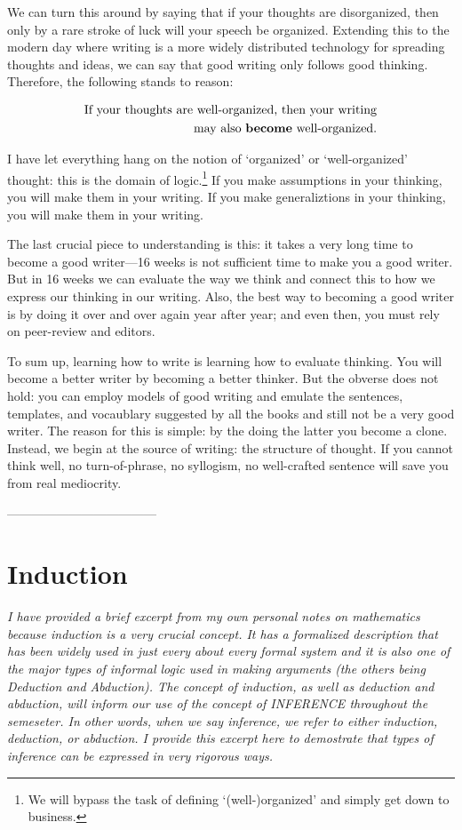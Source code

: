 \documentclass{article}
\begin{document}
We can turn this around by saying that if your thoughts are disorganized, then only by a rare stroke of luck will your speech be organized. Extending this to the modern day where writing is a more widely distributed technology for spreading thoughts and ideas, we can say that good writing only follows good thinking. Therefore, the following stands to reason:

\begin{equation}
 \begin{split}
\text{If your thoughts are well-organized, then your writing} \\
\text{may also \textbf{become} well-organized.}
 \end{split}
\end{equation}

 
I have let everything hang on the notion of `organized' or `well-organized' thought: this is the domain of logic.\footnote{We will bypass the task of defining `(well-)organized' and simply get down to business.} If you make assumptions in your thinking, you will make them in your writing. If you make generaliztions in your thinking, you will make them in your writing. 

The last crucial piece to understanding is this: it takes a very long time to become a good writer---16 weeks is not sufficient time to make you a good writer. But in 16 weeks we can evaluate the way we think and connect this to how we express our thinking in our writing. Also, the best way to becoming a good writer is by doing it over and over again year after year; and even then, you must rely on peer-review and editors. 

To sum up, learning how to write is learning how to evaluate thinking. You will become a better writer by becoming a better thinker. But the obverse does not hold: you can employ models of good writing and emulate the sentences, templates, and vocaublary suggested by all the books and still not be a very good writer. The reason for this is simple: by the doing the latter you become a clone. Instead, we begin at the source of writing: the structure of thought. If you cannot think well, no turn-of-phrase, no syllogism, no well-crafted sentence will save you from real mediocrity.

 
------------------------------------
\part{Induction}
\textsl{I have provided a brief excerpt from my own personal notes on mathematics because induction is a very crucial concept. It has a formalized description that has been widely used in just every about every formal system and it is also one of the major types of informal logic used in making arguments (the others being Deduction and Abduction). The concept of induction, as well as deduction and abduction, will inform our use of the concept of INFERENCE throughout the semeseter. In other words, when we say inference, we refer to either induction, deduction, or abduction. I provide this excerpt here to demostrate that types of inference \textsl{can} be expressed in very rigorous ways.} 
\end{document}
